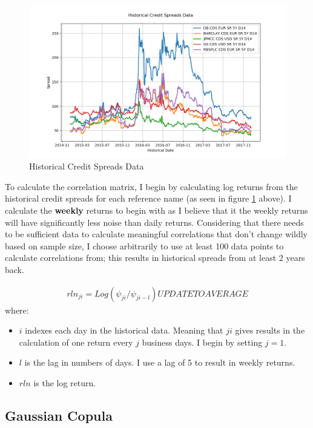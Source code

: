 \documentclass{report}
\theoremstyle{plain}
\theoremstyle{definition}
\begin{document}
\begin{figure}[H]
	\begin{center}
		\includegraphics[width=15cm]{Historical_Credit_Spreads_Data.png}
		\caption{Historical Credit Spreads Data} 
		\label{Historical_Credit_Spreads_Data}
	\end{center}
\end{figure}

To calculate the correlation matrix, I begin by calculating log returns from the historical credit spreads for each reference name (as seen in figure \ref{Historical_Credit_Spreads_Data} above). I calculate the \textbf{weekly} returns to begin with as I believe that it the weekly returns will have significantly less noise than daily returns. Considering that there needs to be sufficient data to calculate meaningful correlations that don't change wildly based on sample size, I choose arbitrarily to use at least 100 data points to calculate correlations from; this results in historical spreads from at least 2 years back. 

\begin{align*}
rln_{ji} = Log(\psi_{ji} / \psi_{ji - l}) UPDATE TO AVERAGE
\end{align*}
where:
\begin{itemize}
	\item $i$ indexes each day in the historical data. Meaning that $ji$ gives results in the calculation of one return every $j$ business days. I begin by setting $j = 1$.
	\item $l$ is the lag in numbers of days. I use a lag of 5 to result in weekly returns.
	\item $rln$ is the log return.
\end{itemize}

\subsection{Gaussian Copula}
\end{document}

